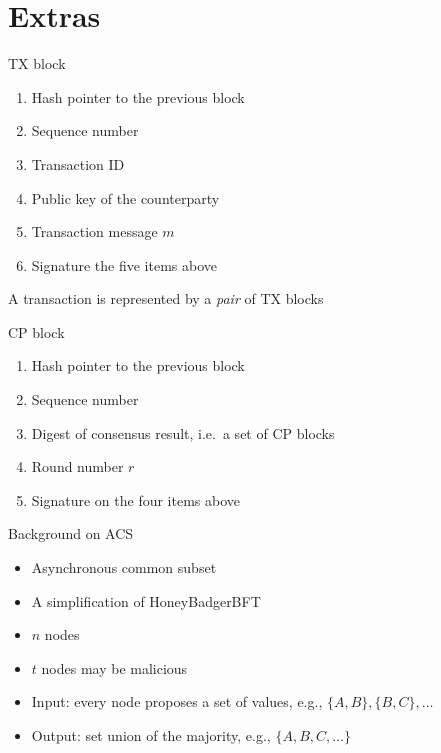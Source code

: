 \documentclass{beamer}
\begin{document}
\section*{Extras}
\begin{frame}{TX block}
  \begin{enumerate}
    \item Hash pointer to the previous block
    \item Sequence number
    \item Transaction ID
    \item Public key of the counterparty
    \item Transaction message $m$
    \item Signature the five items above
  \end{enumerate}
  \vfill
  A transaction is represented by a \emph{pair} of TX blocks
\end{frame}

\begin{frame}{CP block}
  \begin{enumerate}
    \item Hash pointer to the previous block
    \item Sequence number
    \item Digest of consensus result, i.e.~a set of CP blocks
    \item Round number $r$
    \item Signature on the four items above
  \end{enumerate}
\end{frame}

\begin{frame}{Background on ACS}
  \begin{itemize}
    \item Asynchronous common subset
    \item A simplification of HoneyBadgerBFT~\cite{miller2016honey}
    \item $n$ nodes
    \item $t$ nodes may be malicious
    \item Input: every node proposes a set of values, e.g., $\{A, B\}, \{B, C\}, \dots$
    \item Output: set union of the majority, e.g., $\{A, B, C, \dots \}$
  \end{itemize}
\end{frame}
\end{document}
